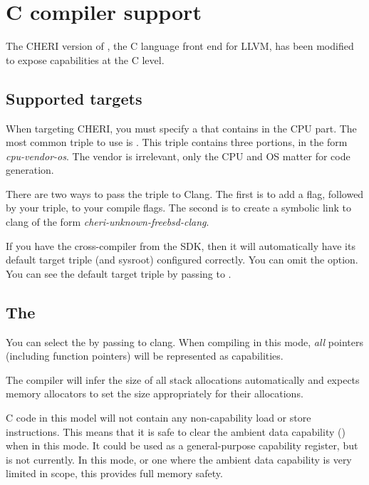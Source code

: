 \chapter{C compiler support}
\label{chap:c-compiler}

The CHERI version of , the C language front end for LLVM, has been modified to expose capabilities at the C level.

\section{Supported targets}

When targeting CHERI, you must specify a  that contains  in the CPU part.  The most common triple to use is .  This triple contains three portions, in the form \textit{cpu-vendor-os}.  The vendor is irrelevant, only the CPU and OS matter for code generation.

There are two ways to pass the triple to Clang.  The first is to add a  flag, followed by your triple, to your compile flags.  The second is to create a symbolic link to clang of the form \textit{cheri-unknown-freebsd-clang}.  

\begin{notebox}{}
If you have the cross-compiler from the SDK, then it will automatically have its default target triple (and sysroot) configured correctly.  You can omit the  option.  You can see the default target triple by passing  to .
\end{notebox}

\section{The \sandboxABI}

\index{\sandboxABI{}}
You can select the \sandboxABI{} by passing  to clang.  When compiling in this mode, \textit{all} pointers (including function pointers) will be represented as capabilities.

The compiler will infer the size of all stack allocations automatically and expects memory allocators to set the size appropriately for their allocations.

C code in this model will not contain any non-capability load or store instructions.  This means that it is safe to clear the ambient data capability () when in this mode.  It could be used as a general-purpose capability register, but is not currently.  In this mode, or one where the ambient data capability is very limited in scope, this provides full memory safety.


